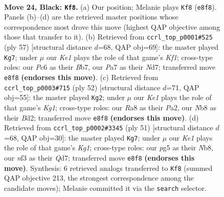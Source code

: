\documentclass[11pt]{article}
\begin{document}
\clearpage

\begin{figure}[p]\centering
\begin{subfigure}{0.46\textwidth}\centering
\resizebox{\linewidth}{!}{%
\newchessgame
\chessboard[
  setfen={rnb1k3/p1q5/2p1p1p1/P1PpP1P1/1P6/2P2N2/8/R1BQK3 b Qq - 2 24},
  showmover=false,
  pgfstyle=straightmove, color=movearrow, markmove={e8-f8}
]}
\caption{}
\end{subfigure}\hfill
\begin{subfigure}{0.46\textwidth}\centering
\resizebox{\linewidth}{!}{%
\newchessgame
\chessboard[
  setfen={3r1k2/1b1n1p2/p1pq2pp/Pp6/1P1P3P/4QNP1/5PB1/2R4K b - - 3 29},
  showmover=false,
  pgfstyle=straightmove, color=movearrow, markmove={f8-g7}
]}
\caption{}
\end{subfigure}
\\[4pt]
\begin{subfigure}{0.46\textwidth}\centering
\resizebox{\linewidth}{!}{%
\newchessgame
\chessboard[
  setfen={5bk1/1p3q2/p1r1pn1p/3p2p1/3P2P1/4QP1P/PP1BN3/5RK1 w - - 3 27},
  showmover=false,
  pgfstyle=straightmove, color=movearrow, markmove={g1-g2}
]}
\caption{}
\end{subfigure}\hfill
\begin{subfigure}{0.46\textwidth}\centering
\resizebox{\linewidth}{!}{%
\newchessgame
\chessboard[
  setfen={1nr3k1/3q1p2/3bp1p1/7p/1p1P3P/1PpQ2P1/2N1PPB1/R5K1 b - - 1 26},
  showmover=false,
  pgfstyle=straightmove, color=movearrow, markmove={g8-g7}
]}
\caption{}
\end{subfigure}
\caption{\textbf{Move 24, Black: \texttt{Kf8}.} (a) Our position; Melanie plays \texttt{Kf8} (\texttt{e8f8}). Panels (b)--(d) are the retrieved master positions whose correspondence most drove this move (highest QAP objective among those that transfer to it). (b) Retrieved from \texttt{ccrl\_top\_p0001\#525} (ply 57) [structural distance $d$=68, QAP obj=69]: the master played \texttt{Kg7}; under $\mu$ our \emph{Ke1} plays the role of that game's \emph{Kf1}; cross-type roles: our \emph{P}c6 as their \emph{B}b7, our \emph{P}a7 as their \emph{N}d7; transferred move \texttt{e8f8} \textbf{(endorses this move)}. (c) Retrieved from \texttt{ccrl\_top\_p0003\#715} (ply 52) [structural distance $d$=71, QAP obj=55]: the master played \texttt{Kg2}; under $\mu$ our \emph{Ke1} plays the role of that game's \emph{Kg1}; cross-type roles: our \emph{R}a8 as their \emph{P}a2, our \emph{N}b8 as their \emph{B}d2; transferred move \texttt{e8f8} \textbf{(endorses this move)}. (d) Retrieved from \texttt{ccrl\_top\_p0002\#3345} (ply 51) [structural distance $d$=68, QAP obj=30]: the master played \texttt{Kg7}; under $\mu$ our \emph{Ke1} plays the role of that game's \emph{Kg1}; cross-type roles: our \emph{p}g5 as their \emph{N}b8, our \emph{n}f3 as their \emph{Q}d7; transferred move \texttt{e8f8} \textbf{(endorses this move)}. Synthesis: 6 retrieved analogs transferred to \texttt{Kf8} (summed QAP objective 213, the strongest correspondence among the candidate moves); Melanie committed it via the \texttt{search} selector.}
\label{fig:thought-m47}
\end{figure}
\end{document}
